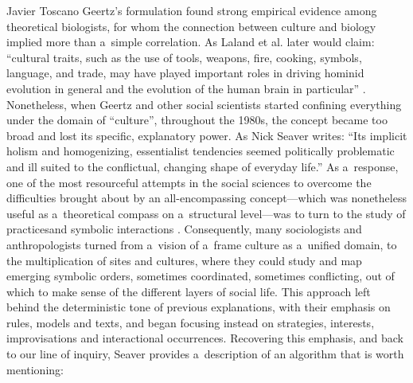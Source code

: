 \begin{artengenv}{Javier Toscano}
Geertz's formulation found strong empirical evidence among theoretical biologists, for whom the connection between culture and biology implied more than a~simple correlation. As Laland et al.
\parencite*[][p.131]{laland_niche_2000} %
 later would claim: ``cultural traits, such as the use of tools, weapons, fire, cooking, symbols, language, and trade, may have played important roles in driving hominid evolution in general and the evolution of the human brain in particular'' 
\parencites[see also][]{dunbar_coevolution_1993}[or][]{aiello_expensive-tissue_1995}. %
 Nonetheless, when Geertz and other social scientists started confining everything under the domain of ``culture'', throughout the 1980s, the concept became too broad and lost its specific, explanatory power. As Nick Seaver 
\parencite*[][p.4]{seaver_algorithms_2017} %
 writes: ``Its implicit holism and homogenizing, essentialist tendencies seemed politically problematic and ill suited to the conflictual, changing shape of everyday life.'' As a~response, one of the most resourceful attempts in the social sciences to overcome the difficulties brought about by an all-encompassing concept---which was nonetheless useful as a~theoretical compass on a~structural level---was to turn to the study of practicesand symbolic interactions 
\parencites[][]{bourdieu_outline_1972}[][]{certeau_practice_1984}[][]{blumer_symbolic_1986}. %
 Consequently, many sociologists and anthropologists turned from a~vision of a~frame culture as a~unified domain, to the multiplication of sites and cultures, where they could study and map emerging symbolic orders, sometimes coordinated, sometimes conflicting, out of which to make sense of the different layers of social life. This approach left behind the deterministic tone of previous explanations, with their emphasis on rules, models and texts, and began focusing instead on strategies, interests, improvisations and interactional occurrences. Recovering this emphasis, and back to our line of inquiry, Seaver 
\parencite*[][p.5]{seaver_algorithms_2017} %
 provides a~description of an algorithm that is worth mentioning:
 

\end{artengenv}
